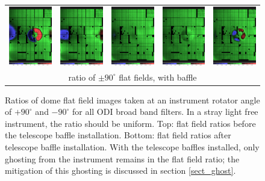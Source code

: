 \documentclass[]{spieman}
\begin{document}
\begin{figure}
\begin{tabular}{ccccc}
			
			\includegraphics[width=0.18\columnwidth]{images/baffle_u.png} &
			\includegraphics[width=0.18\columnwidth]{images/baffle_g.png} &
			\includegraphics[width=0.18\columnwidth]{images/baffle_r.png} &
			\includegraphics[width=0.18\columnwidth]{images/baffle_i.png} &
			\includegraphics[width=0.18\columnwidth]{images/baffle_z.png} 
			\\[1ex] 
			\multicolumn{5}{c}{ratio of $\pm 90^\circ$ flat
				fields, with baffle} \\[2ex] 
		\end{tabular}
		
		\caption{\label{fig_flatfieldbaffle} Ratios of dome flat field 
			images
			taken at an instrument rotator angle of $+90^\circ$ and 
			$-90^\circ$ 
			for all ODI broad band filters. In a stray light free  
			instrument, the ratio should 
			be uniform. Top: flat field ratios before the telescope baffle 
			installation. 
			Bottom: flat field ratios after telescope baffle installation. 
			With the telescope 
			baffles installed, only ghosting from the instrument remains in 
			the flat field 
			ratio; the mitigation of this ghosting is discussed in section 
			\ref{sect_ghost}. }
		
	\end{figure}
\end{document}
